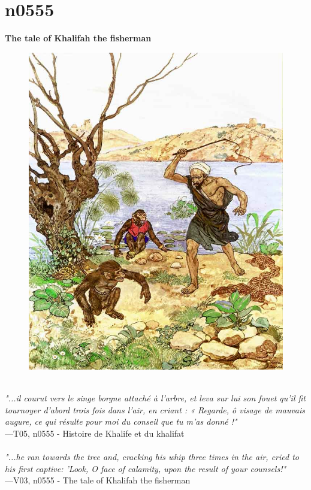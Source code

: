 \documentclass[../Carre_nights.tex]{subfiles}
\begin{document}
\newpage

\section{n0555}
\textbf{\Large{The tale of Khalifah the fisherman}} \\

\begin{figure}[ht]
\centering
\includegraphics[height=\figsize]{illustrations/volume_5/T05, n0555 - Histoire de Khalife et du khalifat.jpg}
\end{figure}

\textit{\\
"...il courut vers le singe borgne attaché à l’arbre, et leva sur lui son fouet qu’il fit tournoyer d’abord trois fois dans l’air, en criant : « Regarde, ô visage de mauvais augure, ce qui résulte pour moi du conseil que tu m’as donné !"} \\
—T05, n0555 - Histoire de Khalife et du khalifat \\~\\
\textit{"...he ran towards the tree and, cracking his whip three times in the air, cried to his first captive: 'Look, O face of calamity, upon the result of your counsels!"} \\
—V03, n0555 - The tale of Khalifah the fisherman
\end{document}
